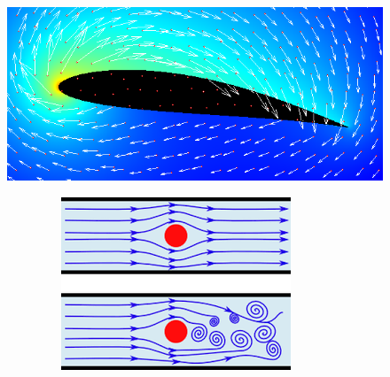 \documentclass[11pt]{article}
\begin{document}
\begin{multicols}{2}

    \begin{figure}[H]
        \centering
        \includegraphics[width=0.8\linewidth]{3x11-equations/ns-4.png}
  \end{figure}

    \begin{figure}[H]
        \centering
        \includegraphics[width=0.8\linewidth]{3x11-equations/ns-5.png}
  \end{figure}
\end{multicols}
\end{document}
